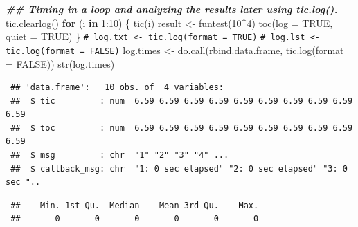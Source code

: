 \documentclass[
  10pt,
]{book}
\newenvironment{Shaded}{\begin{snugshade}}{\end{snugshade}}
\newcommand{\AttributeTok}[1]{\textcolor[rgb]{0.77,0.63,0.00}{#1}}
\newcommand{\CommentTok}[1]{\textcolor[rgb]{0.56,0.35,0.01}{\textit{#1}}}
\newcommand{\ConstantTok}[1]{\textcolor[rgb]{0.00,0.00,0.00}{#1}}
\newcommand{\ControlFlowTok}[1]{\textcolor[rgb]{0.13,0.29,0.53}{\textbf{#1}}}
\newcommand{\DecValTok}[1]{\textcolor[rgb]{0.00,0.00,0.81}{#1}}
\newcommand{\DocumentationTok}[1]{\textcolor[rgb]{0.56,0.35,0.01}{\textbf{\textit{#1}}}}
\newcommand{\FunctionTok}[1]{\textcolor[rgb]{0.00,0.00,0.00}{#1}}
\newcommand{\NormalTok}[1]{#1}
\newcommand{\OtherTok}[1]{\textcolor[rgb]{0.56,0.35,0.01}{#1}}
\newcommand{\SpecialCharTok}[1]{\textcolor[rgb]{0.00,0.00,0.00}{#1}}
\theoremstyle{break}
\theoremstyle{nonumberplain}
\renewcommand{\CommentTok}[1]{\textcolor[rgb]{0.41,0.41,0.41}{\texttt{#1}}}
\begin{document}
\begin{Shaded}
\begin{Highlighting}[]
\DocumentationTok{\#\# Timing in a loop and analyzing the results later using tic.log().}
\FunctionTok{tic.clearlog}\NormalTok{()}
\ControlFlowTok{for}\NormalTok{ (i }\ControlFlowTok{in} \DecValTok{1}\SpecialCharTok{:}\DecValTok{10}\NormalTok{)}
\NormalTok{\{}
   \FunctionTok{tic}\NormalTok{(i)}
\NormalTok{   result }\OtherTok{\textless{}{-}} \FunctionTok{funtest}\NormalTok{(}\DecValTok{10}\SpecialCharTok{\^{}}\DecValTok{4}\NormalTok{)}
   \FunctionTok{toc}\NormalTok{(}\AttributeTok{log =} \ConstantTok{TRUE}\NormalTok{, }\AttributeTok{quiet =} \ConstantTok{TRUE}\NormalTok{)}
\NormalTok{\}}
\CommentTok{\# log.txt \textless{}{-} tic.log(format = TRUE)}
\CommentTok{\# log.lst \textless{}{-} tic.log(format = FALSE)}
\NormalTok{log.times }\OtherTok{\textless{}{-}} \FunctionTok{do.call}\NormalTok{(rbind.data.frame, }\FunctionTok{tic.log}\NormalTok{(}\AttributeTok{format =} \ConstantTok{FALSE}\NormalTok{))}
\FunctionTok{str}\NormalTok{(log.times)}
\end{Highlighting}
\end{Shaded}

\begin{verbatim}
 ## 'data.frame':   10 obs. of  4 variables:
 ##  $ tic         : num  6.59 6.59 6.59 6.59 6.59 6.59 6.59 6.59 6.59 6.59
 ##  $ toc         : num  6.59 6.59 6.59 6.59 6.59 6.59 6.59 6.59 6.59 6.59
 ##  $ msg         : chr  "1" "2" "3" "4" ...
 ##  $ callback_msg: chr  "1: 0 sec elapsed" "2: 0 sec elapsed" "3: 0 sec "..
\end{verbatim}

\begin{Shaded}
\end{Shaded}

\begin{verbatim}
 ##    Min. 1st Qu.  Median    Mean 3rd Qu.    Max. 
 ##       0       0       0       0       0       0
\end{verbatim}
\end{document}
